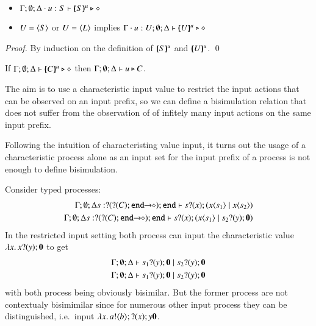 \begin{proposition}\rm
$ $
	\begin{itemize}
		\item	$\Gamma; \emptyset; \Delta \cdot u:S \vdash [\!\!(S)\!\!]^{u} \triangleright \diamond$
		\item	$U = \langle S \rangle$ or $U = \langle L \rangle$ implies $\Gamma \cdot u:U; \emptyset; \Delta \vdash [\!\!(U)\!\!]^{u} \triangleright \diamond$
	\end{itemize}
\end{proposition}

\begin{proof}
	By induction on the definition of $[\!\!(S)\!\!]^{u}$ and $[\!\!(U)\!\!]^{u}$.
	\qed
\end{proof}

\begin{corollary}\rm
	If $\Gamma; \emptyset; \Delta \vdash [\!\!(C)\!\!]^{u} \triangleright \diamond$
	then
	$\Gamma; \emptyset; \Delta \vdash u \triangleright C$.
\end{corollary}

The aim is to use a characteristic input value
to restrict the input actions that can be observed on an
input prefix, so we can define
a bisimulation relation that does not suffer from the observation of 
of infitely many input actions on the same input prefix.

Following the intuition of characteristing value input,
it turns out the usage of a characteristic process
alone as an input set for the input prefix of a process
is not enough to define bisimulation.

\begin{example}
	\label{ex:char_proc}
	Consider typed processes:
	\begin{eqnarray*}
		\Gamma; \es; \Delta s: \btinp{\shot{\btinp{C} \tinact}} \tinact \proves \binp{s}{x} (\appl{x}{s_1} \Par \appl{x}{s_2})\\
		\Gamma; \es; \Delta s: \btinp{\shot{\btinp{C} \tinact}} \tinact \proves \binp{s}{x} (\appl{x}{s_1} \Par \binp{s_2}{y} \inact)
	\end{eqnarray*}
	In the restricted input setting both process can input the
	characteristic value $\lambda x.\,x ? (y) ; \mathbf{0}$
	to get
	\begin{eqnarray*}
		\Gamma; \emptyset; \Delta \vdash s_1 ? (y) ; \mathbf{0} \;|\; s_2 ? (y) ; \mathbf{0}\\
		\Gamma; \emptyset; \Delta \vdash s_1 ? (y) ; \mathbf{0} \;|\; s_2 ? (y) ; \mathbf{0}
	\end{eqnarray*}
	with both process being obviously bisimilar.
	But the former process are not contextualy bisimimilar since
	for numerous other input process they can be distinguished,
	i.e.~input $\lambda x.\,a ! \langle b \rangle ; ? (x) ;{y} \mathbf{0}$.
\end{example}

